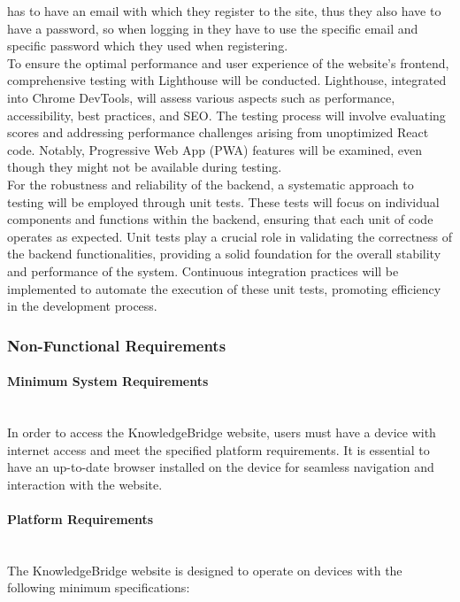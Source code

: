 \documentclass[12pt,a4paper]{article}
\begin{document}
\begin{spacing}{1.5}
    has to have an email with which they register to the site, thus they also have
    to have a password, so when logging in they have to use the specific email and
    specific password which they used when registering. \\ \indent To ensure the
    optimal performance and user experience of the website's frontend,
    comprehensive testing with Lighthouse will be conducted. Lighthouse, integrated
    into Chrome DevTools, will assess various aspects such as performance,
    accessibility, best practices, and SEO. The testing process will involve
    evaluating scores and addressing performance challenges arising from
    unoptimized React code. Notably, Progressive Web App (PWA) features will be
    examined, even though they might not be available during testing. \\ \indent
    For the robustness and reliability of the backend, a systematic approach to
    testing will be employed through unit tests. These tests will focus on
    individual components and functions within the backend, ensuring that each unit
    of code operates as expected. Unit tests play a crucial role in validating the
    correctness of the backend functionalities, providing a solid foundation for
    the overall stability and performance of the system. Continuous integration
    practices will be implemented to automate the execution of these unit tests,
    promoting efficiency in the development process.
    \subsubsection{Non-Functional Requirements}

    \paragraph{Minimum System Requirements} \mbox{} \\ \indent
    In order to access the KnowledgeBridge website, users must have a device with internet access and meet the specified platform requirements. It is essential to have an up-to-date browser installed on the device for seamless navigation and interaction with the website.

    \paragraph{Platform Requirements} \mbox{} \\ \indent
    The KnowledgeBridge website is designed to operate on devices with the following minimum specifications:


\end{spacing}
\end{document}
